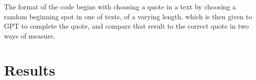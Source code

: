 \documentclass{article}
\begin{document}
The format of the code begins with choosing a quote in a text by choosing a random beginning spot in one of texts, of a varying length, which is then given to GPT to complete the quote, and compare that result to the correct quote in two ways of measure.











\section{Results}
\label{sec:results}



\end{document}
